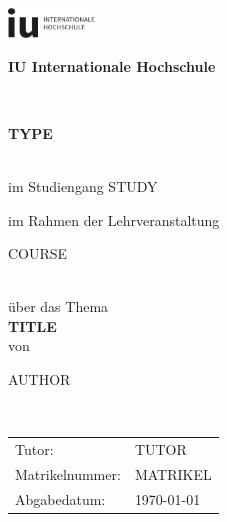 \documentclass[11pt,oneside,titlepage,listof=totoc,bibliography=totoc]{scrartcl}
\newcommand{\myAutor}{{{ AUTHOR }}}
\newcommand{\myTitel}{{{ TITLE }}}
\newcommand{\myBetreuer}{{{ TUTOR }}}
\newcommand{\myLehrveranstaltung}{{{ COURSE }}}
\newcommand{\myMatrikelNr}{{{ MATRIKEL }}}
\newcommand{\myAbgabeDatum}{\today}
\newcommand{\myHochschulName}{IU Internationale Hochschule}
\newcommand{\myStudiengang}{{{ STUDY }}}
\newcommand{\myThesisArt}{{{ TYPE }}}
\begin{document}
\thispagestyle{empty}

\renewcommand{\symheadingname}{Symbolverzeichnis}
\newcommand{\abbreHeadingName}{Abkürzungsverzeichnis}
\newcommand{\headingNameInternetSources}{Internetquellen}
\newcommand{\AppendixName}{Anhang}

\begin{titlepage}
	\begin{center}
    \includegraphics[width=2.3cm]{doc/assets/IULogo.png} \\
    \vspace{.5cm}
		\begin{Large}\textbf{\myHochschulName}\end{Large}\\
    \vspace{.5cm}
		\vspace{2cm}
    \begin{Large}\textbf{\myThesisArt}\end{Large}\\
    \vspace{.5cm}
    im Studiengang \myStudiengang
		\vspace{1.7cm}

		im Rahmen der Lehrveranstaltung\\
    \vspace{0.5cm}
		\begin{Large}{\myLehrveranstaltung}\end{Large}\\
		\vspace{1.8cm}
		über das Thema\\
    \vspace{0.5cm}
		\large{\textbf{\myTitel}}\\
		\vspace{2cm}
    von\\
    \vspace{0.5cm}
    \begin{Large}{\myAutor}\end{Large}\\
	\end{center}
	\normalsize
	\vfill
    \begin{tabular}{ l l }
        Tutor: & \myBetreuer\\
        Matrikelnummer: & \myMatrikelNr\\
        Abgabedatum: & \myAbgabeDatum
    \\
    \end{tabular}
\end{titlepage}
\end{document}
